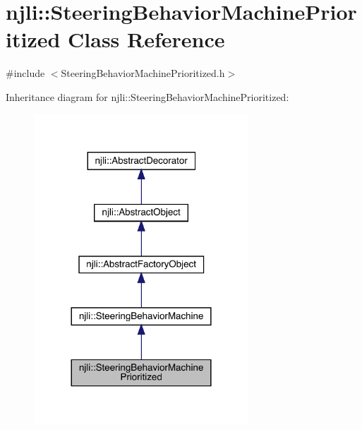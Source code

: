 \hypertarget{classnjli_1_1_steering_behavior_machine_prioritized}{}\section{njli\+:\+:Steering\+Behavior\+Machine\+Prioritized Class Reference}
\label{classnjli_1_1_steering_behavior_machine_prioritized}


{\ttfamily \#include $<$Steering\+Behavior\+Machine\+Prioritized.\+h$>$}



Inheritance diagram for njli\+:\+:Steering\+Behavior\+Machine\+Prioritized\+:\nopagebreak
\begin{figure}[H]
\begin{center}
\leavevmode
\includegraphics[width=228pt]{classnjli_1_1_steering_behavior_machine_prioritized__inherit__graph}
\end{center}
\end{figure}


